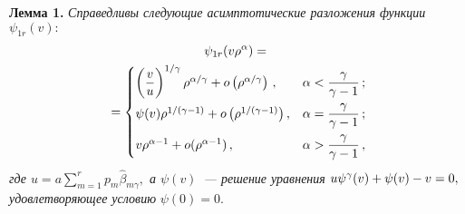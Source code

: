\begin{multicols}{2}
\smallskip

\noindent
\textbf{Лемма 1.} \textit{Справедливы следующие асимптотические разложения функции 
$\psi_{1r}(v):$
\begin{multline}
\label{8}
\psi_{1r}(v\rho^{\alpha})
={}\\
{}=\begin{cases}
\left(\displaystyle\frac{\displaystyle v\mathstrut}{\displaystyle u\mathstrut}\right)^{{1}/{\gamma}}\rho^{{\alpha}/{\gamma}}+o\left(\rho^{{\alpha}/{\gamma}}\right)\,,&\alpha<\displaystyle\frac{\displaystyle \gamma\mathstrut}{\displaystyle \gamma-1\mathstrut}\,;
\\[6pt]
\psi(v)\rho^{{1}/({\gamma-1})}+o\left(\rho^{{1}/({\gamma-1})}\right),&\alpha=\displaystyle\frac{\displaystyle \gamma\mathstrut}{\displaystyle \gamma-1\mathstrut}\,;\\[6pt]
v\rho^{\alpha-1}+o(\rho^{\alpha-1})\,,&\alpha>\displaystyle\frac{\displaystyle \gamma\mathstrut}{\displaystyle \gamma-1\mathstrut}\,,
\end{cases}
\end{multline}
где $u=a\sum\limits_{m=1}^rp_m\hat{\beta}_{m\gamma},$ а $\psi(v)$~--- решение 
уравнения $u\psi^{\gamma}(v)\hm+\psi(v)\hm-v\hm=0,$ удовлетворяющее
условию} $\psi(0)=0.$

\smallskip


\end{multicols}
